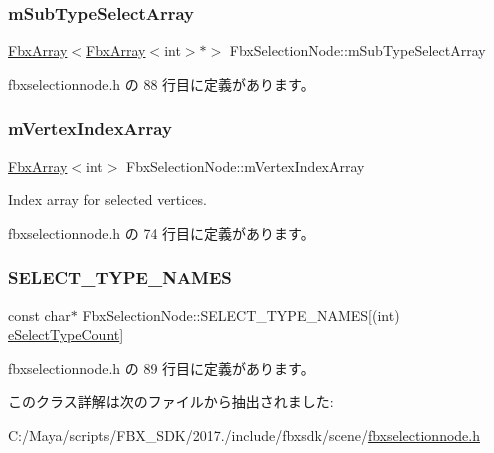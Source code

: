 \subsubsection{\texorpdfstring{m\+Sub\+Type\+Select\+Array}{mSubTypeSelectArray}}
{\footnotesize\ttfamily \hyperlink{class_fbx_array}{Fbx\+Array}$<$\hyperlink{class_fbx_array}{Fbx\+Array}$<$int$>$$\ast$$>$ Fbx\+Selection\+Node\+::m\+Sub\+Type\+Select\+Array}



 fbxselectionnode.\+h の 88 行目に定義があります。

\mbox{\label{class_fbx_selection_node_ad58af0a699e64661e138fc9c17cb33c2}} 
\subsubsection{\texorpdfstring{m\+Vertex\+Index\+Array}{mVertexIndexArray}}
{\footnotesize\ttfamily \hyperlink{class_fbx_array}{Fbx\+Array}$<$int$>$ Fbx\+Selection\+Node\+::m\+Vertex\+Index\+Array}

Index array for selected vertices. 

 fbxselectionnode.\+h の 74 行目に定義があります。

\mbox{\label{class_fbx_selection_node_ad7174a58a6d0031ac615900251821fd5}} 
\subsubsection{\texorpdfstring{S\+E\+L\+E\+C\+T\+\_\+\+T\+Y\+P\+E\+\_\+\+N\+A\+M\+ES}{SELECT\_TYPE\_NAMES}}
{\footnotesize\ttfamily const char$\ast$ Fbx\+Selection\+Node\+::\+S\+E\+L\+E\+C\+T\+\_\+\+T\+Y\+P\+E\+\_\+\+N\+A\+M\+ES\mbox{[}(int) \hyperlink{class_fbx_selection_node_aa24cf47b60ff436a1cce9409da37e78fa6f7e60aadbb76284e3352814a5a4f299}{e\+Select\+Type\+Count}\mbox{]}\hspace{0.3cm}{\ttfamily [static]}}



 fbxselectionnode.\+h の 89 行目に定義があります。



このクラス詳解は次のファイルから抽出されました\+:\begin{DoxyCompactItemize}
\item 
C\+:/\+Maya/scripts/\+F\+B\+X\+\_\+\+S\+D\+K/2017./include/fbxsdk/scene/\hyperlink{fbxselectionnode_8h}{fbxselectionnode.\+h}\end{DoxyCompactItemize}
